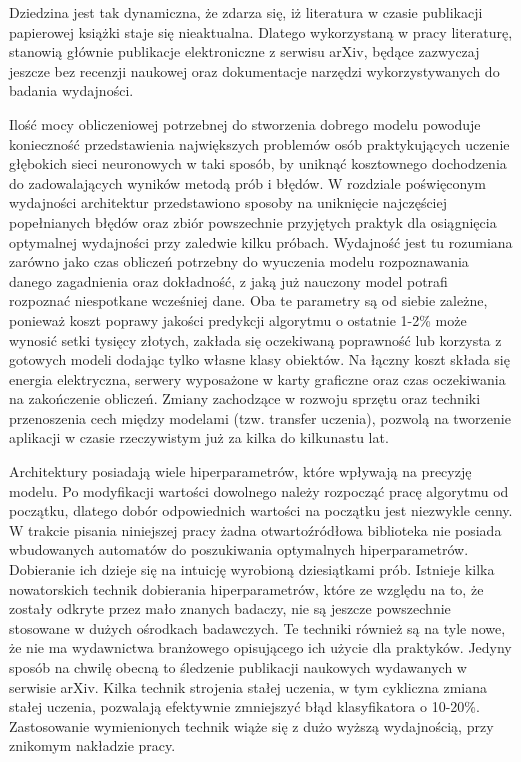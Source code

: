\documentclass[12pt,a4paper,twoside,titlepage,openright]{book}
\begin{document}
Dziedzina jest tak dynamiczna, że zdarza się, iż literatura w czasie publikacji papierowej książki staje się nieaktualna. Dlatego wykorzystaną w pracy literaturę, stanowią głównie publikacje elektroniczne z serwisu arXiv, będące zazwyczaj jeszcze bez recenzji naukowej oraz dokumentacje narzędzi wykorzystywanych do badania wydajności. 

Ilość mocy obliczeniowej potrzebnej do stworzenia dobrego modelu powoduje konieczność przedstawienia największych problemów osób praktykujących uczenie głębokich sieci neuronowych w taki sposób, by uniknąć kosztownego dochodzenia do zadowalających wyników metodą prób i błędów. W rozdziale poświęconym wydajności architektur przedstawiono sposoby na uniknięcie najczęściej popełnianych błędów oraz zbiór powszechnie przyjętych praktyk dla osiągnięcia optymalnej wydajności przy zaledwie kilku próbach. Wydajność jest tu rozumiana zarówno jako czas obliczeń potrzebny do wyuczenia modelu rozpoznawania danego zagadnienia oraz dokładność, z jaką już nauczony model potrafi rozpoznać niespotkane wcześniej dane. Oba te parametry są od siebie zależne, ponieważ koszt poprawy jakości predykcji algorytmu o ostatnie 1-2\% może wynosić setki tysięcy złotych, zakłada się oczekiwaną poprawność lub korzysta z gotowych modeli dodając tylko własne klasy obiektów. Na łączny koszt składa się energia elektryczna, serwery wyposażone w karty graficzne oraz czas oczekiwania na zakończenie obliczeń. Zmiany zachodzące w rozwoju sprzętu oraz techniki przenoszenia cech między modelami (tzw. transfer uczenia), pozwolą na tworzenie aplikacji w czasie rzeczywistym już za kilka do kilkunastu lat.

Architektury posiadają wiele hiperparametrów, które wpływają na precyzję modelu. Po modyfikacji wartości dowolnego należy rozpocząć pracę algorytmu od początku, dlatego dobór odpowiednich wartości na początku jest niezwykle cenny. W trakcie pisania niniejszej pracy żadna otwartoźródłowa biblioteka nie posiada wbudowanych automatów do poszukiwania optymalnych hiperparametrów. Dobieranie ich dzieje się na intuicję wyrobioną dziesiątkami prób. Istnieje kilka nowatorskich technik dobierania hiperparametrów, które ze względu na to, że zostały odkryte przez mało znanych badaczy, nie są jeszcze powszechnie stosowane w dużych ośrodkach badawczych. Te techniki również są na tyle nowe, że nie ma wydawnictwa branżowego opisującego ich użycie dla praktyków. Jedyny sposób na chwilę obecną to śledzenie publikacji naukowych wydawanych w serwisie arXiv. Kilka technik strojenia stałej uczenia, w tym cykliczna zmiana stałej uczenia, pozwalają efektywnie zmniejszyć błąd klasyfikatora o 10-20\%. Zastosowanie wymienionych technik wiąże się z dużo wyższą wydajnością, przy znikomym nakładzie pracy. 
\end{document}
